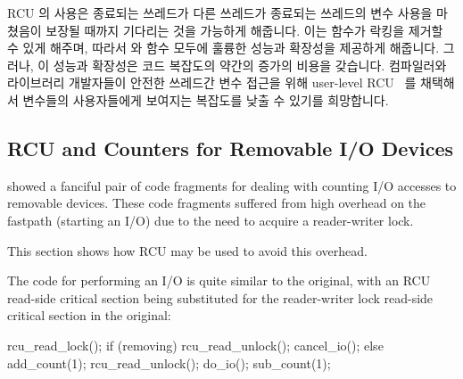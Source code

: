 RCU 의 사용은 종료되는 쓰레드가 다른 쓰레드가 종료되는 쓰레드의 
변수 사용을 마쳤음이 보장될 때까지 기다리는 것을 가능하게 해줍니다.
이는  함수가 락킹을 제거할 수 있게 해주며, 따라서
 와  함수 모두에 훌륭한 성능과 확장성을
제공하게 해줍니다.
그러나, 이 성능과 확장성은 코드 복잡도의 약간의 증가의 비용을 갖습니다.
컴파일러와 라이브러리 개발자들이 안전한 쓰레드간  변수 접근을 위해
user-level RCU~\cite{MathieuDesnoyers2009URCU} 를 채택해서 
변수들의 사용자들에게 보여지는 복잡도를 낮출 수 있기를 희망합니다.

\iffalse

Use of RCU enables exiting threads to wait until other threads are
guaranteed to be done using the exiting threads' \co{__thread} variables.
This allows the \co{read_count()} function to dispense with locking,
thereby providing
excellent performance and scalability for both the \co{inc_count()}
and \co{read_count()} functions.
However, this performance and scalability come at the cost of some increase
in code complexity.
It is hoped that compiler and library writers employ user-level
RCU~\cite{MathieuDesnoyers2009URCU} to provide safe cross-thread
access to \co{__thread} variables, greatly reducing the
complexity seen by users of \co{__thread} variables.

\fi

\subsection{RCU and Counters for Removable I/O Devices}
\label{sec:together:RCU and Counters for Removable I/O Devices}

showed a fanciful pair of code fragments for dealing with counting
I/O accesses to removable devices.
These code fragments suffered from high overhead on the fastpath
(starting an I/O) due to the need to acquire a reader-writer
lock.

This section shows how RCU may be used to avoid this overhead.

The code for performing an I/O is quite similar to the original, with
an RCU read-side critical section being substituted for the reader-writer
lock read-side critical section in the original:

\begin{VerbatimN}[tabsize=8]
rcu_read_lock();
if (removing) {
	rcu_read_unlock();
	cancel_io();
} else {
	add_count(1);
	rcu_read_unlock();
	do_io();
	sub_count(1);
}
\end{VerbatimN}
\vspace{5pt}

